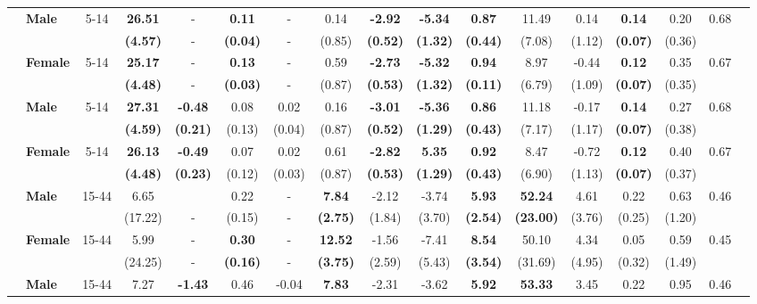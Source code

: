\documentclass{article}
\begin{document}
\begin{table}[!htbp]
\begin{tabular}{@{\extracolsep{.05pt}}|clccccccccccccccc|}
& \textbf{Male} & 5-14 & \textbf{26.51} & - & \textbf{0.11} & - & 0.14 & \textbf{-2.92} & \textbf{-5.34} & \textbf{0.87} & 11.49 & 0.14 & \textbf{0.14} & 0.20 & 0.68 & \\
&  & & \textbf{(4.57)} & - & \textbf{(0.04)} & - & (0.85) & \textbf{(0.52)} & \textbf{(1.32)} & \textbf{(0.44)} & (7.08) & (1.12) & \textbf{(0.07)} & (0.36) & & \\
& \textbf{Female} & 5-14 & \textbf{25.17} & - & \textbf{0.13} & - & 0.59 & \textbf{-2.73} & \textbf{-5.32} & \textbf{0.94} & 8.97 & -0.44 & \textbf{0.12} & 0.35 & 0.67 & \\
&  & & \textbf{(4.48)} & - & \textbf{(0.03)} & - & (0.87) & \textbf{(0.53)} & \textbf{(1.32)} & \textbf{(0.11)} & (6.79) & (1.09) & \textbf{(0.07)} & (0.35) & & \\
& \textbf{Male} & 5-14 & \textbf{27.31} & \textbf{-0.48} & 0.08 & 0.02 & 0.16 & \textbf{-3.01} & \textbf{-5.36} & \textbf{0.86} & 11.18 & -0.17 & \textbf{0.14} & 0.27 & 0.68 & \\
&  & & \textbf{(4.59)} & \textbf{(0.21)} & (0.13) & (0.04) & (0.87) & \textbf{(0.52)} & \textbf{(1.29)} & \textbf{(0.43)} & (7.17) & (1.17) & \textbf{(0.07)} & (0.38) & & \\
& \textbf{Female} & 5-14 & \textbf{26.13} & \textbf{-0.49} & 0.07 & 0.02 & 0.61 & \textbf{-2.82} & \textbf{5.35} & \textbf{0.92} & 8.47 & -0.72 & \textbf{0.12} & 0.40 & 0.67 & \\
&  && \textbf{(4.48)} & \textbf{(0.23)} & (0.12) & (0.03) & (0.87) & \textbf{(0.53)} & \textbf{(1.29)} & \textbf{(0.43)} & (6.90) & (1.13) & \textbf{(0.07)} & (0.37) & & \\
& \textbf{Male} & 15-44 & 6.65 & & 0.22 & - & \textbf{7.84} & -2.12 & -3.74 & \textbf{5.93} & \textbf{52.24} & 4.61 & 0.22 & 0.63 & 0.46 & \\
&  & & (17.22) & - & (0.15) & - & \textbf{(2.75)} & (1.84) & (3.70) & \textbf{(2.54)} & \textbf{(23.00)} & (3.76) & (0.25) & (1.20) & & \\
& \textbf{Female} & 15-44 & 5.99 & - & \textbf{0.30} & - & \textbf{12.52} & -1.56 & -7.41 & \textbf{8.54} & 50.10 & 4.34 & 0.05 & 0.59 & 0.45 & \\
&  & & (24.25) & - & \textbf{(0.16)} & - & \textbf{(3.75)} & (2.59) & (5.43) & \textbf{(3.54)} & (31.69) & (4.95) & (0.32) & (1.49) & & \\
& \textbf{Male} & 15-44 & 7.27 & \textbf{-1.43} & 0.46 & -0.04 & \textbf{7.83} & -2.31 & -3.62 & \textbf{5.92} & \textbf{53.33} & 3.45 & 0.22 & 0.95 & 0.46 &\\

\end{tabular}
\end{table}
\end{document}
